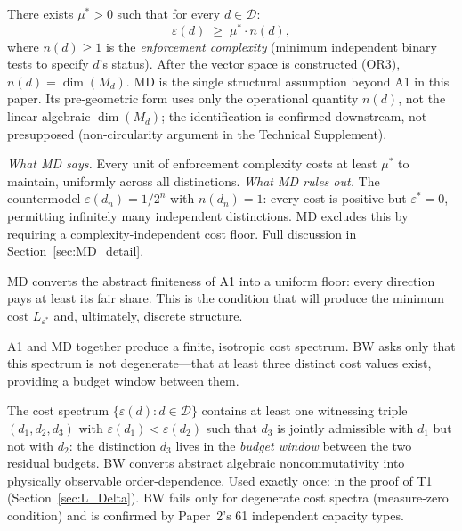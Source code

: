 \documentclass[11pt]{article}
\theoremstyle{remark}
\begin{document}
\begin{tcolorbox}[defbox, title={Structural Assumption MD (Enforcement Isotropy)}]
There exists $\mu^* > 0$ such that for every $d \in \mathcal{D}$:
\[
\varepsilon(d) \;\geq\; \mu^* \cdot n(d),
\]
where $n(d) \ge 1$ is the \emph{enforcement complexity} (minimum independent binary tests to specify $d$'s status).  After the vector space is constructed (OR3), $n(d) = \dim(M_d)$.  MD is the single structural assumption beyond A1 in this paper.  Its pre-geometric form uses only the operational quantity $n(d)$, not the linear-algebraic $\dim(M_d)$; the identification is confirmed downstream, not presupposed (non-circularity argument in the Technical Supplement).

\smallskip\noindent\textit{What MD says.}  Every unit of enforcement complexity costs at least $\mu^*$ to maintain, uniformly across all distinctions.  \textit{What MD rules out.}  The countermodel $\varepsilon(d_n) = 1/2^n$ with $n(d_n) = 1$: every cost is positive but $\varepsilon^* = 0$, permitting infinitely many independent distinctions.  MD excludes this by requiring a complexity-independent cost floor.  Full discussion in Section~\ref{sec:MD_detail}.
\end{tcolorbox}

\smallskip\noindent MD converts the abstract finiteness of A1 into a uniform floor: every direction pays at least its fair share.  This is the condition that will produce the minimum cost $L_{\varepsilon^*}$ and, ultimately, discrete structure.

\smallskip\noindent A1 and MD together produce a finite, isotropic cost spectrum.  BW asks only that this spectrum is not degenerate---that at least three distinct cost values exist, providing a budget window between them.

\begin{tcolorbox}[defbox, title={Richness Premise BW (Budget Window)}]
The cost spectrum $\{\varepsilon(d) : d \in \mathcal{D}\}$ contains at least one witnessing triple $(d_1, d_2, d_3)$ with $\varepsilon(d_1) < \varepsilon(d_2)$ such that $d_3$ is jointly admissible with $d_1$ but not with $d_2$: the distinction $d_3$ lives in the \emph{budget window} between the two residual budgets.  BW converts abstract algebraic noncommutativity into physically observable order-dependence.  Used exactly once: in the proof of T1 (Section~\ref{sec:L_Delta}).  BW fails only for degenerate cost spectra (measure-zero condition) and is confirmed by Paper~2's 61 independent capacity types.
\end{tcolorbox}
\end{document}
